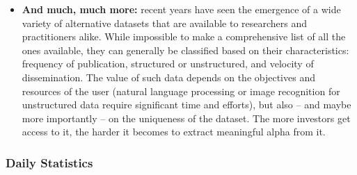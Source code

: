 \begin{itemize}
\item \textbf{And much, much more:} recent years have seen the emergence of a wide variety of alternative datasets that are available to researchers and practitioners alike.  
While impossible to make a comprehensive list of all the ones available, they can generally be classified based on their characteristics: frequency of publication, structured or unstructured, and velocity of dissemination. The value of such data depends on the objectives and resources of the user (natural language processing or image recognition for unstructured data require significant time and efforts), but also -- and maybe more importantly -- on the uniqueness of the dataset. The more investors get access to it, the harder it becomes to extract meaningful alpha from it.
\end{itemize}

\subsubsection{Daily Statistics}

